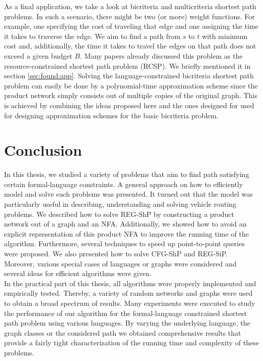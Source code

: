 \documentclass[]{article}
\numberwithin{equation}{section}
\begin{document}
As a final application, we take a look at bicriteria and multicriteria shortest path problems. In such a scenario, there might be two (or more) weight functions. For example, one specifying the cost of traveling that edge and one assigning the time it takes to traverse the edge. We aim to find a path from $s$ to $t$ with minimum cost and, additionally, the time it takes to travel the edges on that path does not exceed a given budget $B$. Many papers already discussed this problem as the resource-constrained shortest path problem (RCSP). We briefly mentioned it in section \ref{sec:found:app}. Solving the language-constrained bicriteria shortest path problem can easily be done by a polynomial-time approximation scheme since the product network simply consists out of multiple copies of the original graph. This is achieved by combining the ideas proposed here and the ones designed for used for designing approximation schemes for the basic bicriteria problem.

\newpage

\section{Conclusion}
\label{sec:conclusion}

In this thesis, we studied a variety of problems that aim to find path satisfying certain formal-language constraints. A general approach on how to efficiently model and solve such problems was presented. It turned out that the model was particularly useful in describing, understanding and solving vehicle routing problems. We described how to solve REG-ShP by constructing a product network out of a graph and an NFA. Additionally, we showed how to avoid an explicit representation of this product NFA to improve the running time of the algorithm. Furthermore, several techniques to speed up point-to-point queries were proposed. We also presented how to solve CFG-ShP and REG-SiP. Moreover, various special cases of languages or graphs were considered and several ideas for efficient algorithms were given.\\ 

In the practical part of this thesis, all algorithms were properly implemented and empirically tested. Thereby, a variety of random networks and graphs were used to obtain a broad spectrum of results. Many experiments were executed to study the performance of our algorithm for the formal-language constrained shortest path problem using various languages. By varying the underlying language, the graph classes or the considered path we obtained comprehensive results that provide a fairly tight characterization of the running time and complexity of these problems.\\
\end{document}
